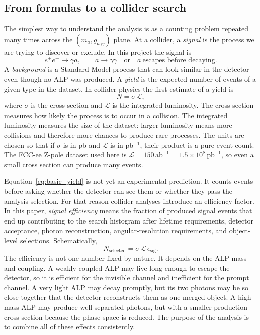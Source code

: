 \documentclass[12pt,a4paper]{article}
\newcommand{\gagg}{g_{a\gamma\gamma}}
\newcommand{\Lint}{\mathcal{L}}
\newcommand{\abinv}{\,\text{ab}^{-1}}
\newcommand{\pbinv}{\,\text{pb}^{-1}}
\begin{document}
\subsection{From formulas to a collider search}

The simplest way to understand the analysis is as a counting problem repeated
many times across the $(m_a,\gagg)$ plane.
At a collider, a \emph{signal} is the process we are trying to discover or
exclude. In this project the signal is
\begin{equation}
    e^+e^- \to \gamma a,
    \qquad
    a\to\gamma\gamma
    \quad \text{or} \quad
    a\ \text{escapes before decaying}.
\end{equation}
A \emph{background} is a Standard Model process that can look similar in the
detector even though no ALP was produced. A \emph{yield} is the expected number
of events of a given type in the dataset. In collider physics the first
estimate of a yield is
\begin{equation}
    N = \sigma\,\Lint,
    \label{eq:basic_yield}
\end{equation}
where $\sigma$ is the cross section and $\Lint$ is the integrated luminosity.
The cross section measures how likely the process is to occur in a collision.
The integrated luminosity measures the size of the dataset: larger luminosity
means more collisions and therefore more chances to produce rare processes.
The units are chosen so that if $\sigma$ is in pb and $\Lint$ is in
pb$^{-1}$, their product is a pure event count. The FCC-ee Z-pole dataset used
here is $\Lint=150\abinv=1.5\times10^8\pbinv$, so even a small cross section
can produce many events.

Equation~\eqref{eq:basic_yield} is not yet an experimental prediction.
It counts events before asking whether the detector can see them or whether
they pass the analysis selection. For that reason collider analyses introduce
an efficiency factor. In this paper, \emph{signal efficiency} means the
fraction of produced signal events that end up contributing to the search
histogram after lifetime requirements, detector acceptance, photon
reconstruction, angular-resolution requirements, and object-level selections.
Schematically,
\begin{equation}
    N_\mathrm{selected}
    =
    \sigma\,\Lint\,\epsilon_\mathrm{sig}.
    \label{eq:selected_yield_intro}
\end{equation}
The efficiency is not one number fixed by nature. It depends on the ALP mass
and coupling. A weakly coupled ALP may live long enough to escape the detector,
so it is efficient for the invisible channel and inefficient for the prompt
channel. A very light ALP may decay promptly, but its two photons may be so
close together that the detector reconstructs them as one merged object. A
high-mass ALP may produce well-separated photons, but with a smaller production
cross section because the phase space is reduced. The purpose of the analysis
is to combine all of these effects consistently.
\end{document}
